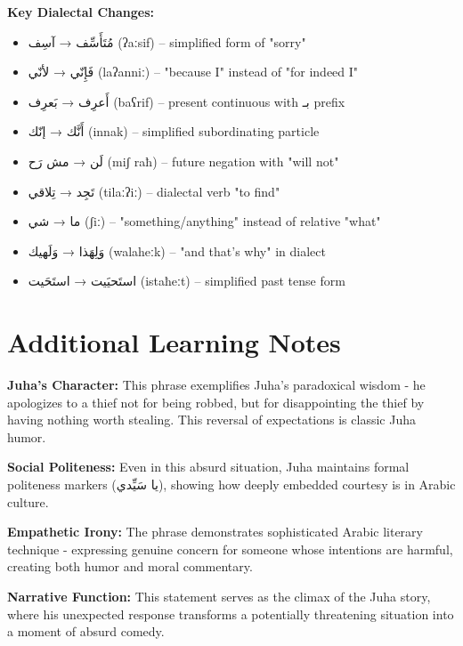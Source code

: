 \documentclass[a4paper,12pt]{article}
\begin{document}
\textbf{Key Dialectal Changes:}
\begin{itemize}
\item \textarabic{مُتَأَسِّف} → \textarabic{آسِف} (ʔaːsif) – simplified form of "sorry"
\item \textarabic{فَإِنّي} → \textarabic{لأنّي} (laʔanniː) – "because I" instead of "for indeed I"
\item \textarabic{أَعرِف} → \textarabic{بَعرِف} (baʕrif) – present continuous with بـ prefix
\item \textarabic{أَنَّك} → \textarabic{إنّك} (innak) – simplified subordinating particle
\item \textarabic{لَن} → \textarabic{مش رَح} (miʃ raħ) – future negation with "will not"
\item \textarabic{تَجِد} → \textarabic{تِلاقي} (tilaːʔiː) – dialectal verb "to find"
\item \textarabic{ما} → \textarabic{شي} (ʃiː) – "something/anything" instead of relative "what"
\item \textarabic{وَلِهَذا} → \textarabic{وَلَهيك} (walaheːk) – "and that's why" in dialect
\item \textarabic{استَحيَيت} → \textarabic{استَحَيت} (istaħeːt) – simplified past tense form
\end{itemize}

\section{Additional Learning Notes}

\begin{tcolorbox}[colback=boxcolor,colframe=accentcolor,title=\textbf{Cultural and Literary Context}]
\textbf{Juha's Character:} This phrase exemplifies Juha's paradoxical wisdom - he apologizes to a thief not for being robbed, but for disappointing the thief by having nothing worth stealing. This reversal of expectations is classic Juha humor.

\textbf{Social Politeness:} Even in this absurd situation, Juha maintains formal politeness markers (\textarabic{يا سَيِّدي}), showing how deeply embedded courtesy is in Arabic culture.

\textbf{Empathetic Irony:} The phrase demonstrates sophisticated Arabic literary technique - expressing genuine concern for someone whose intentions are harmful, creating both humor and moral commentary.

\textbf{Narrative Function:} This statement serves as the climax of the Juha story, where his unexpected response transforms a potentially threatening situation into a moment of absurd comedy.
\end{tcolorbox}
\end{document}
